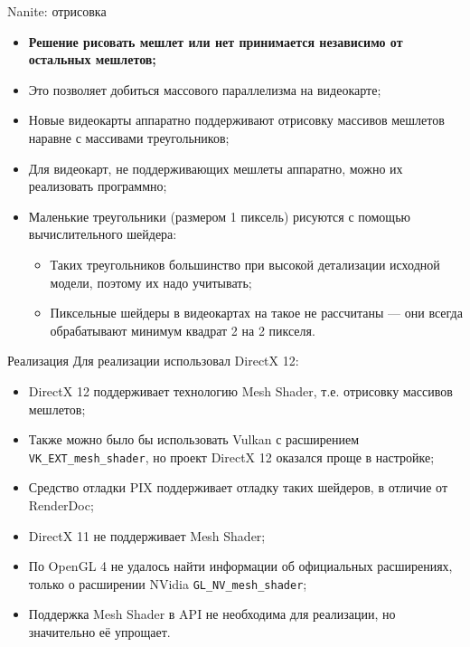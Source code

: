 \documentclass{beamer}
\begin{document}
    \begin{frame}{Nanite: отрисовка}
        \begin{itemize}
            \item \textbf{Решение рисовать мешлет или нет принимается независимо от остальных мешлетов;}
            \item Это позволяет добиться массового параллелизма на видеокарте;
            \item Новые видеокарты аппаратно поддерживают отрисовку массивов мешлетов наравне с массивами треугольников;
            \item Для видеокарт, не поддерживающих мешлеты аппаратно, можно их реализовать программно;
            \item Маленькие треугольники (размером 1 пиксель) рисуются с помощью вычислительного шейдера:
            \begin{itemize}
                \item Таких треугольников большинство при высокой детализации исходной модели, поэтому их надо учитывать;
                \item Пиксельные шейдеры в видеокартах на такое не рассчитаны --- они всегда обрабатывают минимум квадрат 2 на 2 пикселя.
            \end{itemize}
        \end{itemize}
    \end{frame}

    \begin{frame}{Реализация}
        Для реализации использовал DirectX 12:
        \begin{itemize}
            \item DirectX 12 поддерживает технологию Mesh Shader, т.е. отрисовку массивов мешлетов;
            \item Также можно было бы использовать Vulkan с расширением \texttt{VK\_EXT\_mesh\_shader}, но проект DirectX 12 оказался проще в настройке;
            \item Средство отладки PIX поддерживает отладку таких шейдеров, в отличие от RenderDoc;
            \item DirectX 11 не поддерживает Mesh Shader;
            \item По OpenGL 4 не удалось найти информации об официальных расширениях, только о расширении NVidia \texttt{GL\_NV\_mesh\_shader};
            \item Поддержка Mesh Shader в API не необходима для реализации, но значительно её упрощает.
        \end{itemize}
    \end{frame}
\end{document}
